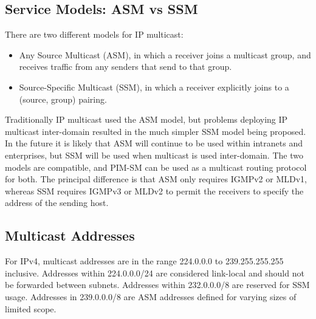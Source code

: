\subsection{Service Models: ASM vs SSM}

There are two different models for IP multicast:
\begin{itemize}
\item Any Source Multicast (ASM), in which a receiver joins a
  multicast group, and receives traffic from any senders that send to
  that group.
\item Source-Specific Multicast (SSM), in which a receiver explicitly
  joins to a (source, group) pairing.
\end{itemize}
Traditionally IP multicast used the ASM model, but problems deploying
IP multicast inter-domain resulted in the much simpler SSM model being
proposed.  In the future it is likely that ASM will continue to be
used within intranets and enterprises, but SSM will be used when
multicast is used inter-domain.  The two models are compatible, and
PIM-SM can be used as a multicast routing protocol for both.  The
principal difference is that ASM only requires IGMPv2 or MLDv1,
whereas SSM requires IGMPv3 or MLDv2 to permit the receivers to
specify the address of the sending host.

\subsection{Multicast Addresses}

For IPv4, multicast addresses are in the range 224.0.0.0 to
239.255.255.255 inclusive.  Addresses within 224.0.0.0/24 are
considered link-local and should not be forwarded between subnets.
Addresses within 232.0.0.0/8 are reserved for SSM usage.  Addresses in
239.0.0.0/8 are ASM addresses defined for varying sizes of limited
scope.

